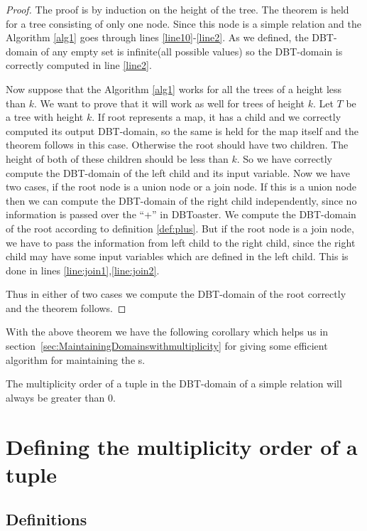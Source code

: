 \documentclass[12pt]{article}
\begin{document}
\begin{proof}
The proof is by induction on the height of the tree. The theorem is held for a tree consisting of only one node. Since this node is a simple relation and the Algorithm \ref{alg1} goes  through lines \ref{line10}-\ref{line2}. As we defined, the DBT-domain of any empty set is infinite(all possible values) so the DBT-domain is correctly computed in line \ref{line2}.

Now suppose that the Algorithm \ref{alg1} works for all the trees of a height less than $k$. We want to prove that it will work as well for trees of height $k$. Let $T$ be a tree with height $k$. If root represents a map, it has a child and we correctly computed its output DBT-domain, so the same is held for the map itself and the theorem follows in this case. Otherwise
the root should have two children. The height of both of these children should be less than $k$. So we have correctly compute the DBT-domain of the left child and its input variable. Now we have two cases, if the root node is a union node or a join node. If this is a union node then we can compute the DBT-domain of the right child independently, since no information is passed over the ``+'' in DBToaster\cite{1}. We compute the DBT-domain of the root according to definition \eqref{def:plus}. But if the root node is a join node, we have to pass the information from left child to the right child, since the right child may have some input variables which are defined in the left child. This is done in lines \ref{line:join1},\ref{line:join2}.\par
Thus in either of two cases we compute the DBT-domain of the root correctly and the theorem follows.
\end{proof}
With the above theorem we have the following corollary which helps us in section~\ref{sec:MaintainingDomainswithmultiplicity} for giving some efficient algorithm for maintaining the \dom{}s. 
\begin{corollary}
\label{col:arity0}
The multiplicity order of a tuple in the DBT-domain of a simple relation will always be greater than 0.
\end{corollary}
\section{Defining the multiplicity order of a tuple}

\subsection{Definitions}\label{Multip-def}
\end{document}
